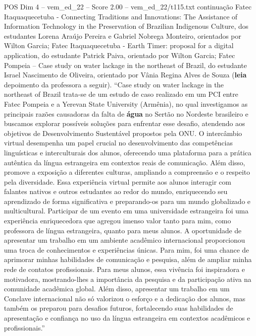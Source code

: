 \begin{textsample}{POS Dim 4 – vem\_ed\_22 – Score 2.00 – vem\_ed\_22/t115.txt}  \label{ex:f4_pos_154}
continuação Fatec Itaquaquecetuba - Connecting Traditions and Innovations: The Assistance of Information Technology in the Preservation of Brazilian Indigenous Culture, dos estudantes Lorena Araújo Pereira e Gabriel Nobrega Monteiro, orientados por Wilton Garcia; Fatec Itaquaquecetuba - Earth Timer: proposal for a digital application, do estudante Patrick Paiva, orientado por Wilton Garcia; Fatec Pompeia – Case study on water lackage in the northeast of Brazil, do estudante Israel Nascimento de Oliveira, orientado por Vânia Regina Alves de Souza (\textbf{leia} depoimento da professora a seguir). “Case study on water lackage in the northeast of Brazil trata-se de um estudo de caso realizado em um PCI entre Fatec Pompeia e a Yerevan State University (Armênia), no qual investigamos as principais razões causadoras da falta de \textbf{água} no Sertão no Nordeste brasileiro e buscamos explorar possíveis soluções para enfrentar esse desafio, atendendo aos objetivos de Desenvolvimento Sustentável propostos pela ONU.
O intercâmbio virtual desempenha um papel crucial no desenvolvimento das competências linguísticas e interculturais dos alunos, oferecendo uma plataforma para a prática autêntica da língua estrangeira em contextos reais de comunicação.
Além disso, promove a exposição a diferentes culturas, ampliando a compreensão e o respeito pela diversidade.
Essa experiência virtual permite aos alunos interagir com falantes nativos e outros estudantes ao redor do mundo, enriquecendo seu aprendizado de forma significativa e preparando-os para um mundo globalizado e multicultural.
Participar de um evento em uma universidade estrangeira foi uma experiência enriquecedora que agregou imenso valor tanto para mim, como professora de língua estrangeira, quanto para meus alunos.
A oportunidade de apresentar um trabalho em um ambiente acadêmico internacional proporcionou uma troca de conhecimentos e experiências únicas.
Para mim, foi uma chance de aprimorar minhas habilidades de comunicação e pesquisa, além de ampliar minha rede de contatos profissionais.
Para meus alunos, essa vivência foi inspiradora e motivadora, mostrando-lhes a importância da pesquisa e da participação ativa na comunidade acadêmica global.
Além disso, apresentar um trabalho em um Conclave internacional não só valorizou o esforço e a dedicação dos alunos, mas também os preparou para desafios futuros, fortalecendo suas habilidades de apresentação e confiança no uso da língua estrangeira em contextos acadêmicos e profissionais.”

\end{textsample}

